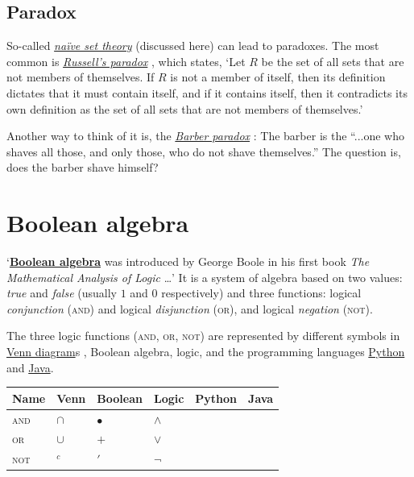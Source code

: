 \documentclass[11pt]{article}%
\begin{document}
\begin{multicols}{2}
\begin{description}
\end{description}

\subsection{Paradox}
\label{Paradox}

So-called \textit{\href{https://en.wikipedia.org/wiki/Naive_set_theory}{na\"ive set theory}} \parencite{wiki:naive-set-theory} (discussed here) can lead to paradoxes. The most common is \textit{\href{https://en.wikipedia.org/wiki/Russell's_paradox}{Russell's paradox}} \parencite{wiki:russells-paradox}, which states, `Let $R$ be the set of all sets that are not members of themselves. If $R$ is not a member of itself, then its definition dictates that it must contain itself, and if it contains itself, then it contradicts its own definition as the set of all sets that are not members of themselves.'

Another way to think of it is, the \textit{\href{https://en.wikipedia.org/wiki/Barber_paradox}{Barber paradox}} \parencite{wiki:barber-paradox}: The barber is the ``...one who shaves all those, and only those, who do not shave themselves.'' The question is, does the barber shave himself?

\section{Boolean algebra}
\label{Boolean}

`\textbf{\href{https://en.wikipedia.org/wiki/Boolean_algebra}{Boolean algebra}} \parencite{wiki:boolean-algebra} was introduced by George Boole in his first book \textit{The Mathematical Analysis of Logic} \parencite{book:mathematical-analysis-of-logic}\dots' It is a system of algebra based on two values: \textit{true} and \textit{false} (usually $1$ and $0$ respectively) and three functions: logical \textit{conjunction} (\textsc{and}) and logical \textit{disjunction} (\textsc{or}), and logical \textit{negation} (\textsc{not}).

The three logic functions (\textsc{and}, \textsc{or}, \textsc{not}) are represented by different symbols in \href{https://en.wikipedia.org/wiki/Venn_diagram}{Venn diagram}s \parencite{wiki:venn-diagram}, Boolean algebra, logic, and the programming languages \href{http://python.org/}{Python} and \href{https://java.oracle.com}{Java}.

\small{\begin{tabularx}{1.0\linewidth}{@{}Y|Y|Y|Y|Y|Y@{}}
Name & Venn & Boolean & Logic & Python & Java \\\hline
\textsc{and} & $\cap$ & $\bullet$ & $\wedge$ &  & \code{\&\&} \\
\textsc{or} & $\cup$ & $+$ & $\vee$ &  & \code{||} \\
\textsc{not} & $^{c}$ & $'$ & $\neg$ &  & \code{!} \\
\end{tabularx}}



\end{multicols}
\end{document}
